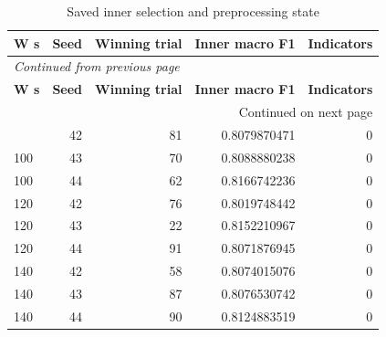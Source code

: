 \documentclass[10pt,a4paper]{article}
\begin{document}
\begin{longtable}{@{}lrrrr@{}}
\caption{Saved inner selection and preprocessing state}\\
\toprule
\textbf{W s} & \textbf{Seed} & \textbf{Winning trial} & \textbf{Inner macro F1} & \textbf{Indicators} \\
\midrule\endfirsthead
\multicolumn{5}{l}{\small\itshape Continued from previous page}\\
\toprule
\textbf{W s} & \textbf{Seed} & \textbf{Winning trial} & \textbf{Inner macro F1} & \textbf{Indicators} \\
\midrule\endhead
\midrule\multicolumn{5}{r}{\small Continued on next page}\\\endfoot
\bottomrule\endlastfoot
100 & 42 & 81 & 0.8079870471 & 0 \\
100 & 43 & 70 & 0.8088880238 & 0 \\
100 & 44 & 62 & 0.8166742236 & 0 \\
120 & 42 & 76 & 0.8019748442 & 0 \\
120 & 43 & 22 & 0.8152210967 & 0 \\
120 & 44 & 91 & 0.8071876945 & 0 \\
140 & 42 & 58 & 0.8074015076 & 0 \\
140 & 43 & 87 & 0.8076530742 & 0 \\
140 & 44 & 90 & 0.8124883519 & 0 \\
\end{longtable}\endgroup
\begingroup\small\setlength{\tabcolsep}{4pt}\renewcommand{\arraystretch}{1.12}
\end{document}
